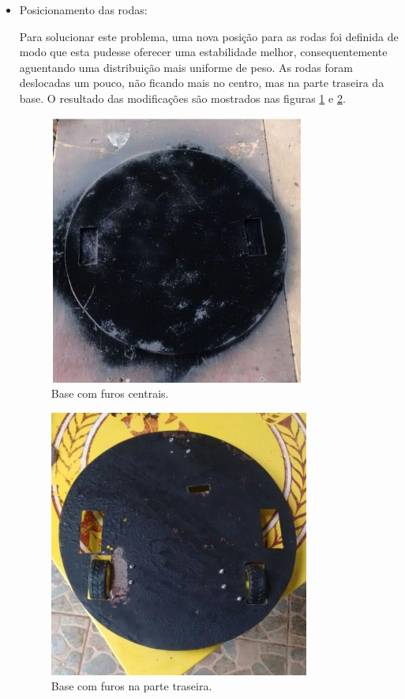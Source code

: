 \begin{itemize}
   	  \item Posicionamento das rodas:

   	  	Para solucionar este problema, uma nova posição para as rodas foi definida de modo que esta pudesse oferecer uma estabilidade melhor, consequentemente aguentando uma distribuição mais uniforme de peso. As rodas foram deslocadas um pouco, não ficando mais no centro, mas na parte traseira da base. O resultado das modificações são mostrados nas figuras \ref{img:baseantiga} e \ref{img:basenova}.

   		\begin{figure}[H]                                                           
            \centering                                                                
            \includegraphics[scale=0.6]{figuras/baseantiga.png}               
            \caption{Base com furos centrais.}    
            \label{img:baseantiga}                                            
         \end{figure}

        \begin{figure}[H]                                                           
            \centering                                                                
            \includegraphics[scale=0.6]{figuras/basenova.png}               
            \caption{Base com furos na parte traseira.}    
            \label{img:basenova}                                            
         \end{figure}


\end{itemize}
